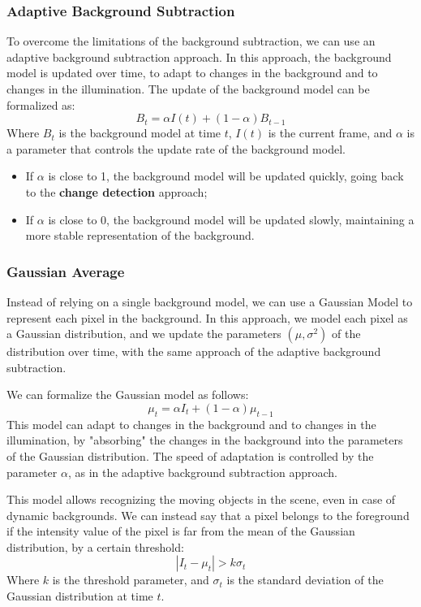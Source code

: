 \subsubsection{Adaptive Background Subtraction}
To overcome the limitations of the background subtraction, we can use an adaptive background subtraction approach.
In this approach, the background model is updated over time, to adapt to changes in the background and to changes in the illumination.
The update of the background model can be formalized as:
\begin{equation}
    B_t = \alpha I(t) + (1 - \alpha) B_{t-1}
\end{equation}
Where $B_t$ is the background model at time $t$, $I(t)$ is the current frame, and $\alpha$ is a parameter that controls the update rate of the background model.
\begin{itemize}
    \item If $\alpha$ is close to 1, the background model will be updated quickly, going back to the \textbf{change detection} approach;
    \item If $\alpha$ is close to 0, the background model will be updated slowly, maintaining a more stable representation of the background.
\end{itemize}

\subsubsection{Gaussian Average}
Instead of relying on a single background model, we can use a Gaussian Model to represent each pixel in the background.
In this approach, we model each pixel as a Gaussian distribution, and we update the parameters $(\mu, \sigma^2)$ of the distribution over time,
with the same approach of the adaptive background subtraction. 

We can formalize the Gaussian model as follows:
\begin{equation}
    \label{eq:gaussian_update}
    \mu_t = \alpha I_t + (1 - \alpha) \mu_{t-1}
\end{equation}
This model can adapt to changes in the background and to changes in the illumination,
by "absorbing" the changes in the background into the parameters of the Gaussian distribution.
The speed of adaptation is controlled by the parameter $\alpha$, as in the adaptive background subtraction approach.

This model allows recognizing the moving objects in the scene, even in case of dynamic backgrounds.
We can instead say that a pixel belongs to the foreground if the intensity value of the pixel is far from the mean of the Gaussian distribution, by a certain threshold:
\begin{equation}
    |I_t - \mu_t| > k \sigma_t
\end{equation}
Where $k$ is the threshold parameter, and $\sigma_t$ is the standard deviation of the Gaussian distribution at time $t$.

